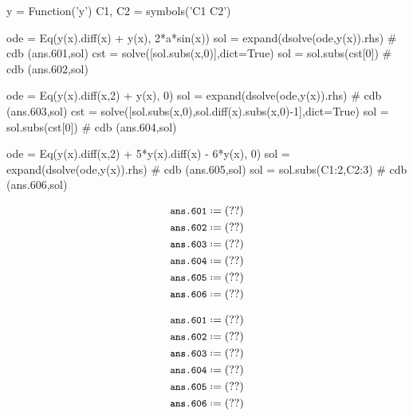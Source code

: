 \documentclass[12pt]{cdblatex}
\begin{document}
\begin{minipage}[t]{0.70\textwidth}
\begin{cadabra}
   y = Function('y')
   C1, C2 = symbols('C1 C2')

   ode = Eq(y(x).diff(x) + y(x), 2*a*sin(x))
   sol = expand(dsolve(ode,y(x)).rhs)                              # cdb (ans.601,sol)
   cst = solve([sol.subs(x,0)],dict=True)
   sol = sol.subs(cst[0])                                          # cdb (ans.602,sol)

   ode = Eq(y(x).diff(x,2) + y(x), 0)
   sol = expand(dsolve(ode,y(x)).rhs)                              # cdb (ans.603,sol)
   cst = solve([sol.subs(x,0),sol.diff(x).subs(x,0)-1],dict=True)
   sol = sol.subs(cst[0])                                          # cdb (ans.604,sol)

   ode = Eq(y(x).diff(x,2) + 5*y(x).diff(x) - 6*y(x), 0)
   sol = expand(dsolve(ode,y(x)).rhs)                              # cdb (ans.605,sol)
   sol = sol.subs({C1:2,C2:3})                                     # cdb (ans.606,sol)
\end{cadabra}
\end{minipage}
\hskip 1cm
\begin{minipage}[t]{0.30\textwidth}
\begin{latex}
   \begin{align*}
      &\cdb*{ans.601}\\
      &\cdb*{ans.602}\\
      &\cdb*{ans.603}\\
      &\cdb*{ans.604}\\
      &\cdb*{ans.605}\\
      &\cdb*{ans.606}
   \end{align*}
\end{latex}
\end{minipage}

\begin{align*}
   &\cdb*{ans.601}\\
   &\cdb*{ans.602}\\
   &\cdb*{ans.603}\\
   &\cdb*{ans.604}\\
   &\cdb*{ans.605}\\
   &\cdb*{ans.606}
\end{align*}
\end{document}
